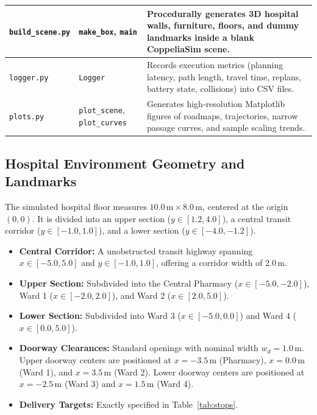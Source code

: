 \documentclass[12pt,a4paper]{article}
\begin{document}
\begin{table}[H]
{\begin{tabular}{|P{4.2cm}|P{3.6cm}|P{7.6cm}|}
\texttt{build\_scene.py} & \texttt{make\_box}, \texttt{main} & Procedurally generates 3D hospital walls, furniture, floors, and dummy landmarks inside a blank CoppeliaSim scene. \\ \hline
\texttt{logger.py} & \texttt{Logger} & Records execution metrics (planning latency, path length, travel time, replans, battery state, collisions) into CSV files. \\ \hline
\texttt{plots.py} & \texttt{plot\_scene}, \texttt{plot\_curves} & Generates high-resolution Matplotlib figures of roadmaps, trajectories, narrow passage curves, and sample scaling trends. \\ \hline
\end{tabular}%
}
\end{table}

\subsection{Hospital Environment Geometry and Landmarks}
The simulated hospital floor measures $10.0\,\text{m} \times 8.0\,\text{m}$, centered at the origin $(0, 0)$. It is divided into an upper section ($y \in [1.2, 4.0]$), a central transit corridor ($y \in [-1.0, 1.0]$), and a lower section ($y \in [-4.0, -1.2]$).
\begin{itemize}[itemsep=2pt,topsep=2pt]
\item \textbf{Central Corridor:} A unobstructed transit highway spanning $x \in [-5.0, 5.0]$ and $y \in [-1.0, 1.0]$, offering a corridor width of $2.0\,\text{m}$.
\item \textbf{Upper Section:} Subdivided into the Central Pharmacy ($x \in [-5.0, -2.0]$), Ward 1 ($x \in [-2.0, 2.0]$), and Ward 2 ($x \in [2.0, 5.0]$).
\item \textbf{Lower Section:} Subdivided into Ward 3 ($x \in [-5.0, 0.0]$) and Ward 4 ($x \in [0.0, 5.0]$).
\item \textbf{Doorway Clearances:} Standard openings with nominal width $w_d = 1.0\,\text{m}$. Upper doorway centers are positioned at $x = -3.5\,\text{m}$ (Pharmacy), $x = 0.0\,\text{m}$ (Ward 1), and $x = 3.5\,\text{m}$ (Ward 2). Lower doorway centers are positioned at $x = -2.5\,\text{m}$ (Ward 3) and $x = 1.5\,\text{m}$ (Ward 4).
\item \textbf{Delivery Targets:} Exactly specified in Table~\ref{tab:stops}.
\end{itemize}
\end{document}
